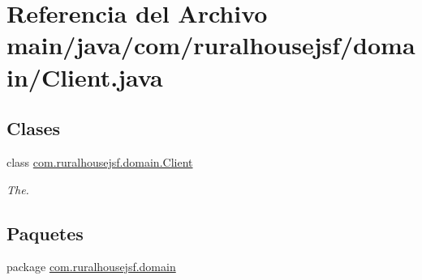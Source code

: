 \hypertarget{a00029}{}\section{Referencia del Archivo main/java/com/ruralhousejsf/domain/\+Client.java}
\label{a00029}
\subsection*{Clases}
\begin{DoxyCompactItemize}
\item 
class \mbox{\hyperlink{a00164}{com.\+ruralhousejsf.\+domain.\+Client}}
\begin{DoxyCompactList}\small\item\em The. \end{DoxyCompactList}\end{DoxyCompactItemize}
\subsection*{Paquetes}
\begin{DoxyCompactItemize}
\item 
package \mbox{\hyperlink{a00114}{com.\+ruralhousejsf.\+domain}}
\end{DoxyCompactItemize}
